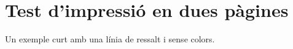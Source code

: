 \documentclass[a4paper]{article}
\begin{document}
\section{Test d'impressió en dues pàgines}
\begin{definicio}[Exemple][important]
Un exemple curt amb una línia de ressalt i sense colors.
\end{definicio}
\end{document}
